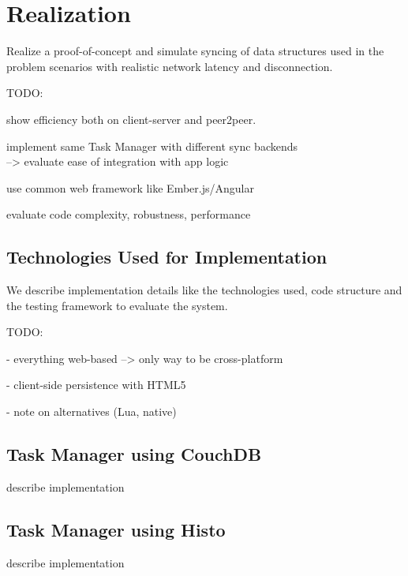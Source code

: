 
\chapter{Realization}
\label{sec:realization}

Realize a proof-of-concept and simulate syncing of data structures
used in the problem scenarios with realistic network latency and
disconnection.

TODO:

show efficiency both on client-server and peer2peer.

implement same Task Manager with different sync backends\\
--> evaluate ease of integration with app logic

use common web framework like Ember.js/Angular

evaluate code complexity, robustness, performance

\section{Technologies Used for Implementation}
We describe implementation details like the technologies used, code structure and the testing framework to evaluate the system.

TODO:

- everything web-based --> only way to be cross-platform

- client-side persistence with HTML5

- note on alternatives (Lua, native)

\section{Task Manager using CouchDB}

describe implementation

\section{Task Manager using Histo}

describe implementation
